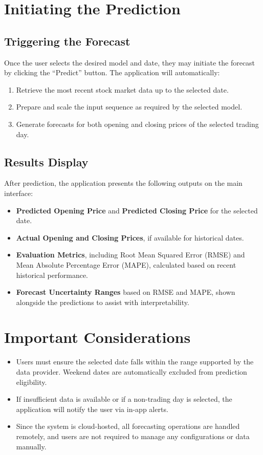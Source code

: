 \section{Initiating the Prediction}

\subsection{Triggering the Forecast}
Once the user selects the desired model and date, they may initiate the forecast by clicking the ``Predict'' button. The application will automatically:
\begin{enumerate}
	\item Retrieve the most recent stock market data up to the selected date.
	\item Prepare and scale the input sequence as required by the selected model.
	\item Generate forecasts for both opening and closing prices of the selected trading day.
\end{enumerate}

\subsection{Results Display}
After prediction, the application presents the following outputs on the main interface:
\begin{itemize}
	\item \textbf{Predicted Opening Price} and \textbf{Predicted Closing Price} for the selected date.
	\item \textbf{Actual Opening and Closing Prices}, if available for historical dates.
	\item \textbf{Evaluation Metrics}, including Root Mean Squared Error (RMSE) and Mean Absolute Percentage Error (MAPE), calculated based on recent historical performance.
	\item \textbf{Forecast Uncertainty Ranges} based on RMSE and MAPE, shown alongside the predictions to assist with interpretability.
\end{itemize}

\section{Important Considerations}
\begin{itemize}
	\item Users must ensure the selected date falls within the range supported by the data provider. Weekend dates are automatically excluded from prediction eligibility.
	\item If insufficient data is available or if a non-trading day is selected, the application will notify the user via in-app alerts.
	\item Since the system is cloud-hosted, all forecasting operations are handled remotely, and users are not required to manage any configurations or data manually.
\end{itemize}

